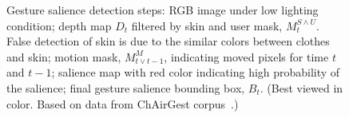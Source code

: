 \documentclass{sig-alternate-2013}
\begin{document}
\begin{figure}[tb]
\centering
\hspace{-0.6em}%
\caption{Gesture salience detection steps:  RGB image under low lighting condition;
 depth map $D_t$ filtered by skin and user mask, $M_t^{S\wedge U}$. False detection of skin is due to
the similar colors between clothes and skin;  motion mask,  $M_{t\vee t-1}^M$, indicating moved pixels for time $t$ and $t-1$;
 salience map with red color indicating high probability of the salience; 
 final gesture salience bounding box, $B_t$. (Best viewed in
color. Based on data from ChAirGest corpus~\cite{Ruffieux2013}.)}
\label{fig:gesture-salience}
\end{figure}
\end{document}
